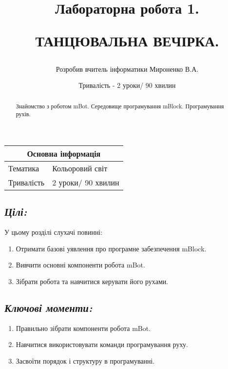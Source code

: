 \documentclass[12pt, a4paper]{article}
\title{Лабораторна робота 1.
	
	ТАНЦЮВАЛЬНА ВЕЧІРКА.}
\author{Розробив вчитель інформатики Мироненко В.А.}
\date{Тривалість - 2 уроки/ 90 хвилин}
\begin{document}
	
	\maketitle
	\begin{abstract}
	Знайомство з роботом mBot. Середовище програмування mBlock. Програмування рухів.
	\end{abstract}
	
	\begin{center}
		\begin{tabular}{|p{} | p{}|}
			\hline 
			\multicolumn{2}{|c|}{Основна інформація}\\
			\hline
			Тематика & Кольоровий світ  \\ 
			\hline
			Тривалість & 2 уроки/ 90 хвилин \\ 
			\hline
		\end{tabular}
	\end{center}
	
	
	\subsection*{\textit{Цілі:}}
	
	У цьому розділі слухачі повинні:
	\begin{enumerate}
		\item Отримати базові уявлення про програмне забезпечення mBlock.
		\item Вивчити основні компоненти робота mBot.
		\item Зібрати робота та навчитися керувати його рухами.
	\end{enumerate}

	\subsection*{\textit{Ключові моменти:}}
	\begin{enumerate}
		\item Правильно зібрати компоненти робота mBot.
		\item Навчитися використовувати команди програмування руху.
		\item Засвоїти порядок і структуру в програмуванні.
	\end{enumerate}
\end{document}
